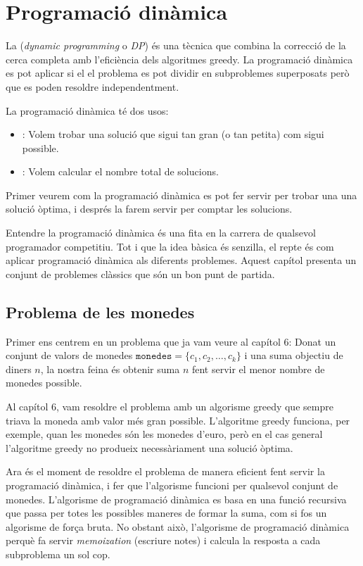 \chapter{Programació dinàmica}


La  (\emph{dynamic programming} o \emph{DP})
és una tècnica que combina la correcció
de la cerca completa amb l'eficiència
dels algoritmes greedy.
La programació dinàmica es pot aplicar si el
el problema es pot dividir en subproblemes superposats
però que es poden resoldre independentment.

La programació dinàmica té dos usos:

\begin{itemize}
\item
{}:
Volem trobar una solució que sigui
tan gran (o tan petita) com sigui possible.
\item
{}:
Volem calcular el nombre total de
solucions.
\end{itemize}

Primer veurem com la programació dinàmica
es pot fer servir per trobar una una solució òptima,
i després la farem servir per
comptar les solucions.

Entendre la programació dinàmica és una fita
en la carrera de qualsevol programador competitiu.
Tot i que la idea bàsica és senzilla,
el repte és com aplicar
programació dinàmica als diferents problemes.
Aquest capítol presenta un conjunt de problemes clàssics
que són un bon punt de partida.

\section{Problema de les monedes}

Primer ens centrem en un problema que
ja vam veure al capítol 6:
Donat un conjunt de valors de monedes $\texttt{monedes} = \{c_1,c_2,\ldots,c_k\}$
i una suma objectiu de diners $n$, la nostra feina és
obtenir suma $n$ fent servir el menor nombre de monedes possible.

Al capítol 6, vam resoldre el problema amb un
algorisme greedy que sempre triava la moneda
amb valor més gran possible.
L'algoritme greedy funciona, per exemple,
quan les monedes són les monedes d'euro,
però en el cas general l'algoritme greedy
no produeix necessàriament una solució òptima.

Ara és el moment de resoldre el problema de manera eficient
fent servir la programació dinàmica, i fer que l'algorisme
funcioni per qualsevol conjunt de monedes.
L'algorisme de programació dinàmica
es basa en una funció recursiva
que passa per totes les possibles maneres de
formar la suma, com si fos un algorisme de força bruta.
No obstant això, l'algorisme de programació dinàmica
perquè fa servir \emph{memoization} (escriure notes) i
calcula la resposta a cada subproblema un sol cop.

